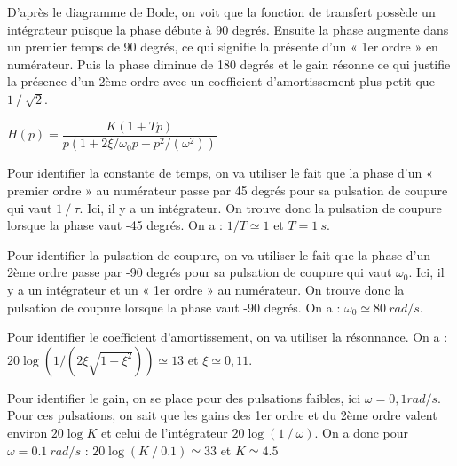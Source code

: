 \ifprof
\begin{corrige}
D’après le diagramme de Bode, on voit que la fonction de transfert possède un intégrateur puisque la phase débute à 90 degrés. Ensuite la phase augmente dans un premier temps de 90 degrés, ce qui signifie la présente d’un « 1er ordre » en numérateur. Puis la phase diminue de 180 degrés  et le gain résonne ce qui justifie la présence d’un 2ème ordre avec un coefficient d’amortissement plus petit que $1⁄\sqrt{2}$.

$H(p)=\dfrac{K(1+Tp)}{p(1+2\xi/\omega_0  p+p^2/(\omega^2 ))}$

Pour identifier la constante de temps, on va utiliser le fait que la phase d’un « premier ordre » au numérateur passe par 45 degrés pour sa pulsation de coupure qui vaut $1⁄\tau$.
Ici, il y a un intégrateur. On trouve donc la pulsation de coupure lorsque la phase vaut -45 degrés. On a :
$1/T\simeq 1$ et $T=\SI{1}{s}$.

Pour identifier la pulsation de coupure, on va utiliser le fait que la phase d’un 2ème ordre passe par -90 degrés pour sa pulsation de coupure qui vaut $\omega_0$.
Ici, il y a un intégrateur et un « 1er ordre » au numérateur. On trouve donc la pulsation de coupure lorsque la phase vaut -90 degrés. On a :
$\omega_0\simeq \SI{80}{rad/s}$.

Pour identifier le coefficient d’amortissement, on va utiliser la résonnance. On a :
$20\log(1/(2\xi\sqrt{1-\xi^2 }))\simeq 13$ et $\xi\simeq 0,11$.

Pour identifier le gain, on se place pour des pulsations faibles, ici $\omega=0,1 rad/s$. Pour ces pulsations, on sait que les gains des 1er ordre et du 2ème ordre valent environ $20\log K$ et celui de l’intégrateur $20\log(1⁄\omega)$. On a donc pour $\omega=\SI{0,1}{rad/s}$ :
$20\log(K⁄0.1)\simeq 33$ et $K\simeq4.5$

\end{corrige}
\else



